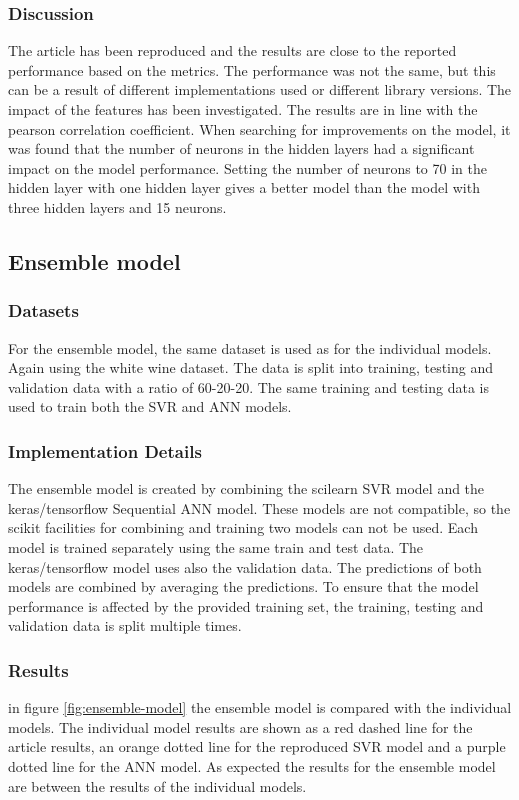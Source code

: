 \documentclass{article}
\begin{document}
\subsubsection{Discussion}
The article has been reproduced and the results are close to the reported performance based on the metrics.
The performance was not the same, but this can be a result of different implementations used or different library versions.
The impact of the features has been investigated. The results are in line with the pearson correlation coefficient.
When searching for improvements on the model, it was found that the number of neurons in the hidden layers had a significant impact on the model performance.
Setting the number of neurons to 70 in the hidden layer with one hidden layer gives a better model than the model with three hidden layers and 15 neurons.

\subsection{Ensemble model}

\subsubsection{Datasets}
For the ensemble model, the same dataset is used as for the individual models. Again using the white wine dataset.
The data is split into training, testing and validation data with a ratio of 60-20-20.
The same training and testing data is used to train both the SVR and ANN models.

\subsubsection{Implementation Details}
The ensemble model is created by combining the scilearn SVR model and the keras/tensorflow Sequential ANN model.
These models are not compatible, so the scikit facilities for combining and training two models can not be used.
Each model is trained separately using the same train and test data. The keras/tensorflow model uses also the validation data.
The predictions of both models are combined by averaging the predictions.
To ensure that the model performance is affected by the provided training set, the training, testing and validation data is split multiple times.

\subsubsection{Results}
in figure \autoref{fig:ensemble-model} the ensemble model is compared with the individual models.
The individual model results are shown as a red dashed line for the article results,
an orange dotted line for the reproduced SVR model and a purple dotted line for the ANN model.
As expected the results for the ensemble model are between the results of the individual models.
\end{document}
